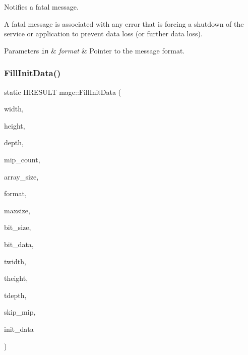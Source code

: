 Notifies a fatal message.

A fatal message is associated with any error that is forcing a shutdown of the service or application to prevent data loss (or further data loss).


\begin{DoxyParams}[1]{Parameters}
\mbox{\tt in}  & {\em format} & Pointer to the message format. \\
\hline
\end{DoxyParams}
\hypertarget{namespacemage_ac20162a68be6828c38072a3afb0711c1}{}\label{namespacemage_ac20162a68be6828c38072a3afb0711c1} 
\subsubsection{\texorpdfstring{Fill\+Init\+Data()}{FillInitData()}}
{\footnotesize\ttfamily static H\+R\+E\+S\+U\+LT mage\+::\+Fill\+Init\+Data (\begin{DoxyParamCaption}\item[{\+\_\+\+In\+\_\+ size\+\_\+t}]{width,  }\item[{\+\_\+\+In\+\_\+ size\+\_\+t}]{height,  }\item[{\+\_\+\+In\+\_\+ size\+\_\+t}]{depth,  }\item[{\+\_\+\+In\+\_\+ size\+\_\+t}]{mip\+\_\+count,  }\item[{\+\_\+\+In\+\_\+ size\+\_\+t}]{array\+\_\+size,  }\item[{\+\_\+\+In\+\_\+ D\+X\+G\+I\+\_\+\+F\+O\+R\+M\+AT}]{format,  }\item[{\+\_\+\+In\+\_\+ size\+\_\+t}]{maxsize,  }\item[{\+\_\+\+In\+\_\+ size\+\_\+t}]{bit\+\_\+size,  }\item[{\+\_\+\+In\+\_\+reads\+\_\+bytes\+\_\+(bit\+\_\+size) const uint8\+\_\+t $\ast$}]{bit\+\_\+data,  }\item[{\+\_\+\+Out\+\_\+ size\+\_\+t \&}]{twidth,  }\item[{\+\_\+\+Out\+\_\+ size\+\_\+t \&}]{theight,  }\item[{\+\_\+\+Out\+\_\+ size\+\_\+t \&}]{tdepth,  }\item[{\+\_\+\+Out\+\_\+ size\+\_\+t \&}]{skip\+\_\+mip,  }\item[{\+\_\+\+Out\+\_\+writes\+\_\+(mip\+\_\+count $\ast$array\+\_\+size) D3\+D11\+\_\+\+S\+U\+B\+R\+E\+S\+O\+U\+R\+C\+E\+\_\+\+D\+A\+TA $\ast$}]{init\+\_\+data }\end{DoxyParamCaption})\hspace{0.3cm}{\ttfamily [static]}}

